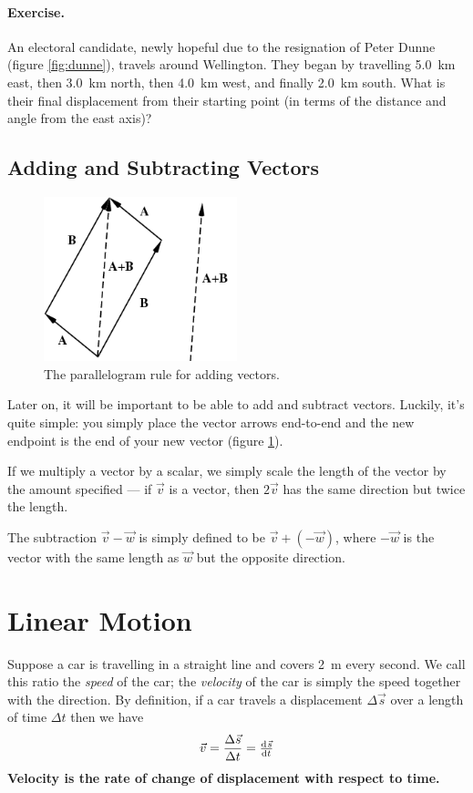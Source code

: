 \documentclass[a4paper]{amsbook}
\newcommand\capcite[1]{}
\begin{document}
\paragraph{Exercise.} An electoral candidate, newly hopeful due to the resignation of Peter Dunne (figure \ref{fig:dunne}), travels around Wellington. They
began by travelling \SI{5.0}{\kilo\metre} east, then \SI{3.0}{\kilo\metre} north, then \SI{4.0}{\kilo\metre} west, and finally \SI{2.0}{\kilo\metre}
south. What is their final displacement from their starting point (in terms of the distance and angle from the east axis)?

\subsection{Adding and Subtracting Vectors}
\begin{figure}
  \centering
  \includegraphics[width=0.5\textwidth]{parallelogram}
  \caption{The parallelogram rule for adding vectors. \capcite{http://mathworld.wolfram.com/images/eps-gif/ParallelogramLaw_1000.gif}\label{fig:parallelogram}}
\end{figure}
Later on, it will be important to be able to add and subtract vectors. Luckily, it's quite
simple: you simply place the vector arrows end-to-end and the new endpoint is the end of
your new vector (figure \ref{fig:parallelogram}).

If we multiply a vector by a scalar, we simply scale the length of the vector by the amount
specified --- if $ \vec v $ is a vector, then $ 2 \vec v $ has the same direction but twice the length.

The subtraction $ \vec v - \vec w $ is simply defined to be $ \vec v + (- \vec w) $, where $ - \vec w $ is the vector with
the same length as $ \vec w $ but the opposite direction.

\section{Linear Motion}
Suppose a car is travelling in a straight line and covers \SI{2}{\metre} every second. We call this
ratio the \textit{speed} of the car; the \textit{velocity} of the car is simply the speed together
with the direction. By definition, if a car travels a displacement $ \Delta \vec s $ over a length of time $ \Delta t $
then we have
\begin{equation}
  \vec v = \frac{\Delta \vec s}{\Delta t} = \od{\vec s}{t}
\end{equation}
\textbf{Velocity is the rate of change of displacement with respect to time.}
\end{document}

